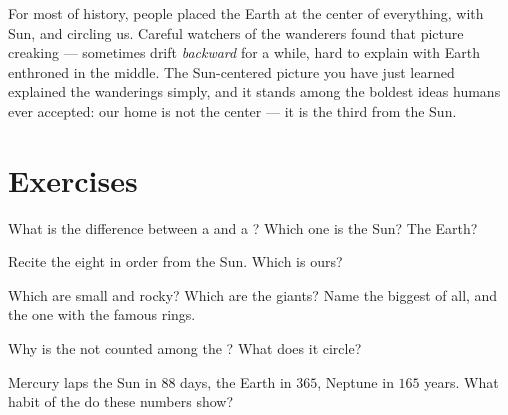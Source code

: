 \begin{remark}\label{rem:g4:solar-system:history}
For most of history, people placed the Earth at the center of
everything, with Sun,  and  circling us. Careful
watchers of the wanderers found that picture creaking --- 
sometimes drift \emph{backward} for a while, hard to explain with
Earth enthroned in the middle. The Sun-centered picture you
have just learned explained the wanderings simply, and it stands
among the boldest ideas humans ever accepted: our home is not the
center --- it is the third  from the Sun.
\end{remark}

\section{Exercises}

\begin{exercise}[$\star$]\label{exo:g4:solar-system:1}
What is the difference between a  and a ? Which one is
the Sun? The Earth?
\end{exercise}

\begin{exercise}[$\star$]\label{exo:g4:solar-system:2}
Recite the eight  in order from the Sun. Which is ours?
\end{exercise}

\begin{exercise}[$\star$]\label{exo:g4:solar-system:3}
Which  are small and rocky? Which are the  giants? Name
the biggest of all, and the one with the famous rings.
\end{exercise}

\begin{exercise}[$\star$]\label{exo:g4:solar-system:4}
Why is the  not counted among the ? What does it circle?
\end{exercise}

\begin{exercise}[$\star$]\label{exo:g4:solar-system:5}
Mercury laps the Sun in $88$ days, the Earth in $365$, Neptune in
$165$ years. What habit of the  do these numbers show?
\end{exercise}


